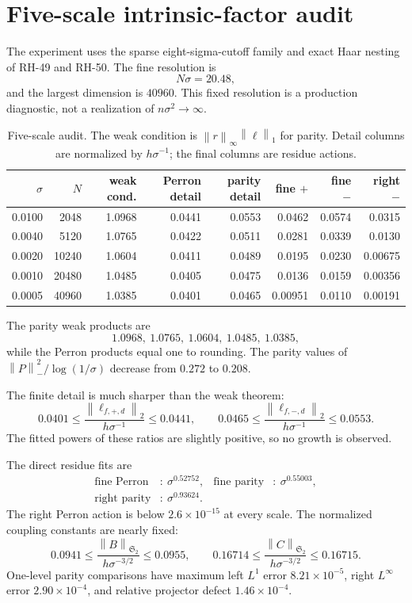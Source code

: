 \documentclass[11pt]{article}
\theoremstyle{remark}
\newcommand{\HS}{\mathfrak S_2}
\newcommand{\norm}[1]{\left\lVert #1\right\rVert}
\begin{document}
\section{Five-scale intrinsic-factor audit}

The experiment uses the sparse eight-sigma-cutoff family and exact Haar
nesting of RH-49 and RH-50.  The fine resolution is
\[
 N\sigma=20.48,
\]
and the largest dimension is \(40960\).  This fixed resolution is a
production diagnostic, not a realization of \(n\sigma^2\to\infty\).

\begin{table}[H]
\centering
\small
\begin{tabular}{@{}rrrrrrrr@{}}
\toprule
\(\sigma\)&\(N\)&weak cond.&Perron detail&parity detail&fine \(+\)&fine \(-\)&right \(-\)\\
\midrule
0.0100&2048 &1.0968&0.0441&0.0553&0.0462&0.0574&0.0315\\
0.0040&5120 &1.0765&0.0422&0.0511&0.0281&0.0339&0.0130\\
0.0020&10240&1.0604&0.0411&0.0489&0.0195&0.0230&0.00675\\
0.0010&20480&1.0485&0.0405&0.0475&0.0136&0.0159&0.00356\\
0.0005&40960&1.0385&0.0401&0.0465&0.00951&0.0110&0.00191\\
\bottomrule
\end{tabular}
\caption{Five-scale audit.  The weak condition is
\(\norm r_\infty\norm\ell_1\) for parity.  Detail columns are normalized
by \(h\sigma^{-1}\); the final columns are residue actions.}
\label{tab:audit}
\end{table}

The parity weak products are
\[
 1.0968,\ 1.0765,\ 1.0604,\ 1.0485,\ 1.0385,
\]
while the Perron products equal one to rounding.  The parity values of
\(\norm P_-^2/\log(1/\sigma)\) decrease from \(0.272\) to \(0.208\).

The finite detail is much sharper than the weak theorem:
\[
 0.0401\le
 \frac{\norm{\ell_{f,+,d}}_2}{h\sigma^{-1}}\le0.0441,
\qquad
 0.0465\le
 \frac{\norm{\ell_{f,-,d}}_2}{h\sigma^{-1}}\le0.0553.
\]
The fitted powers of these ratios are slightly positive, so no growth is
observed.

The direct residue fits are
\begin{align}
 \text{fine Perron}&:\ \sigma^{0.52752},&
 \text{fine parity}&:\ \sigma^{0.55003},\\
 \text{right parity}&:\ \sigma^{0.93624}.
\end{align}
The right Perron action is below \(2.6\times10^{-15}\) at every scale.
The normalized coupling constants are nearly fixed:
\[
 0.0941\le\frac{\norm B_{\HS}}{h\sigma^{-3/2}}\le0.0955,
\qquad
 0.16714\le\frac{\norm C_{\HS}}{h\sigma^{-3/2}}\le0.16715.
\]
One-level parity comparisons have maximum left \(L^1\) error
\(8.21\times10^{-5}\), right \(L^\infty\) error
\(2.90\times10^{-4}\), and relative projector defect
\(1.46\times10^{-4}\).
\end{document}
